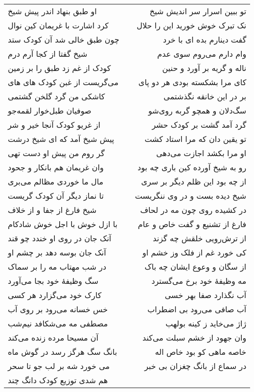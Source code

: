 \begin{center}
\begin{longtable}{l p{0.5cm} r}
او طبق بنهاد اندر پیش شیخ
&&
تو ببین اسرار سر اندیش شیخ
\\
کرد اشارت با غریمان کین نوال
&&
نک تبرک خوش خورید این را حلال
\\
چون طبق خالی شد آن کودک ستد
&&
گفت دینارم بده ای با خرد
\\
شیخ گفتا از کجا آرم درم
&&
وام دارم می‌روم سوی عدم
\\
کودک از غم زد طبق را بر زمین
&&
ناله و گریه بر آورد و حنین
\\
می‌گریست از غبن کودک های های
&&
کای مرا بشکسته بودی هر دو پای
\\
کاشکی من گرد گلخن گشتمی
&&
بر در این خانقه نگذشتمی
\\
صوفیان طبل‌خوار لقمه‌جو
&&
سگ‌دلان و همچو گربه روی‌شو
\\
از غریو کودک آنجا خیر و شر
&&
گرد آمد گشت بر کودک حشر
\\
پیش شیخ آمد که ای شیخ درشت
&&
تو یقین دان که مرا استاد کشت
\\
گر روم من پیش او دست تهی
&&
او مرا بکشد اجازت می‌دهی
\\
وان غریمان هم بانکار و جحود
&&
رو به شیخ آورده کین باری چه بود
\\
مال ما خوردی مظالم می‌بری
&&
از چه بود این ظلم دیگر بر سری
\\
تا نماز دیگر آن کودک گریست
&&
شیخ دیده بست و در وی ننگریست
\\
شیخ فارغ از جفا و از خلاف
&&
در کشیده روی چون مه در لحاف
\\
با ازل خوش با اجل خوش شادکام
&&
فارغ از تشنیع و گفت خاص و عام
\\
آنک جان در روی او خندد چو قند
&&
از ترش‌رویی خلقش چه گزند
\\
آنک جان بوسه دهد بر چشم او
&&
کی خورد غم از فلک وز خشم او
\\
در شب مهتاب مه را بر سماک
&&
از سگان و وعوع ایشان چه باک
\\
سگ وظیفهٔ خود بجا می‌آورد
&&
مه وظیفهٔ خود برخ می‌گسترد
\\
کارک خود می‌گزارد هر کسی
&&
آب نگذارد صفا بهر خسی
\\
خس خسانه می‌رود بر روی آب
&&
آب صافی می‌رود بی اضطراب
\\
مصطفی مه می‌شکافد نیم‌شب
&&
ژاژ می‌خاید ز کینه بولهب
\\
آن مسیحا مرده زنده می‌کند
&&
وان جهود از خشم سبلت می‌کند
\\
بانگ سگ هرگز رسد در گوش ماه
&&
خاصه ماهی کو بود خاص اله
\\
می خورد شه بر لب جو تا سحر
&&
در سماع از بانگ چغزان بی خبر
\\
هم شدی توزیع کودک دانگ چند

\end{longtable}
\end{center}

